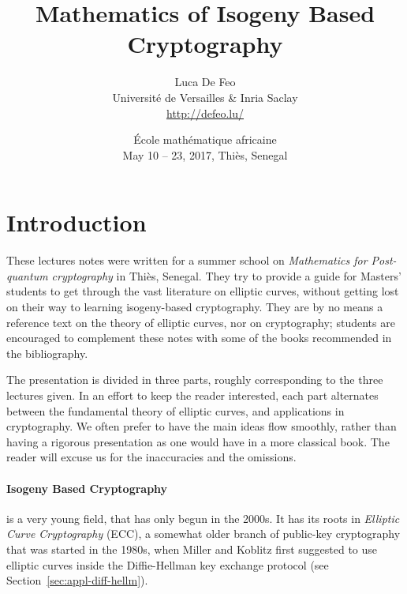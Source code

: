 \documentclass[10pt]{article}
\title{Mathematics of Isogeny Based Cryptography}
\author{Luca De Feo\\
  Universit\'e de Versailles \& Inria Saclay\\
  \url{http://defeo.lu/}}
\date{\'Ecole math\'ematique africaine\\
  May 10 -- 23, 2017, Thi\`es, Senegal}
\theoremstyle{plain}
\theoremstyle{definition}
\begin{document}
\maketitle
\thispagestyle{fancy}
\renewcommand{\headrulewidth}{0pt}
\renewcommand{\footrulewidth}{0.4pt}
\cfoot{\doclicenseThis}

\section*{Introduction}

These lectures notes were written for a summer school on
\emph{Mathematics for Post-quantum cryptography} in Thiès, Senegal. %
They try to provide a guide for Masters' students to get through the
vast literature on elliptic curves, without getting lost on their way
to learning isogeny-based cryptography. %
They are by no means a reference text on the theory of elliptic
curves, nor on cryptography; students are encouraged to complement
these notes with some of the books recommended in the bibliography. %

The presentation is divided in three parts, roughly corresponding to
the three lectures given. %
In an effort to keep the reader interested, each part alternates
between the fundamental theory of elliptic curves, and applications in
cryptography. %
We often prefer to have the main ideas flow smoothly, rather than
having a rigorous presentation as one would have in a more classical
book. %
The reader will excuse us for the inaccuracies and the omissions.

\paragraph{Isogeny Based Cryptography} is a very young field, that has
only begun in the 2000s. %
It has its roots in \emph{Elliptic Curve Cryptography} (ECC), a
somewhat older branch of public-key cryptography that was started in
the 1980s, when Miller and Koblitz first suggested to use elliptic
curves inside the Diffie-Hellman key exchange protocol (see
Section~\ref{sec:appl-diff-hellm}). %
\end{document}
